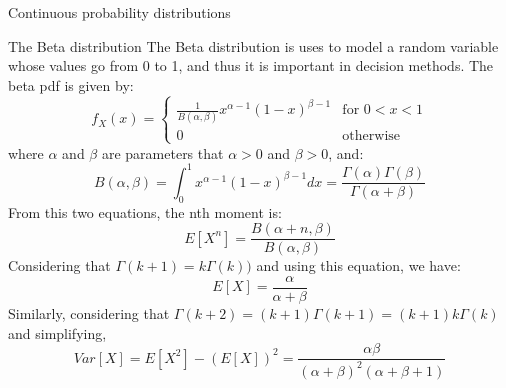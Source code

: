 \documentclass[8pt]{beamer}
\renewcommand{\emph}[1]{\textcolor{myorange}{#1}}
\begin{document}
\begin{frame}{Continuous probability distributions} 
    \begin{block}{The \alert{Beta} distribution}
        The \alert{Beta distribution} is uses to model a random variable whose values go from  0 to 1, and thus it is important in decision methods. The \emph{beta pdf}  is given by: 
\[
f_X (x) =
\begin{cases}
    \frac{1}{B(\alpha, \beta)} x^{\alpha-1} (1-x)^{\beta -1}  & \text{for } 0 < x < 1 \\
    0 & \text{otherwise }
\end{cases}
\]
where $\alpha$ and $\beta$ are parameters that $\alpha > 0$ and $\beta > 0$, and:
\[
    B(\alpha, \beta) = \int_0^1 x^{\alpha -1} (1-x)^{\beta-1} dx = \frac{\Gamma (\alpha) \Gamma (\beta)}{\Gamma (\alpha + \beta)}
\]
From this two equations, the nth moment is:
\[
E[X^n] = \frac{B(\alpha + n, \beta)}{B(\alpha, \beta)}
\]
Considering that $\Gamma (k+1)= k\Gamma (k))$ and using this equation, we have:
\[
    E[X] = \frac{\alpha}{\alpha + \beta}
\]
Similarly, considering that $\Gamma (k+2) = (k+1)\Gamma (k+1)=(k+1)k\Gamma(k) $ and simplifying,
\[
    Var[X] = E[X^2] - \left( E[X] \right)^2 = \frac{\alpha \beta}{(\alpha + \beta)^2 (\alpha + \beta +1)}
\]

               \end{block}
\end{frame}
\end{document}
